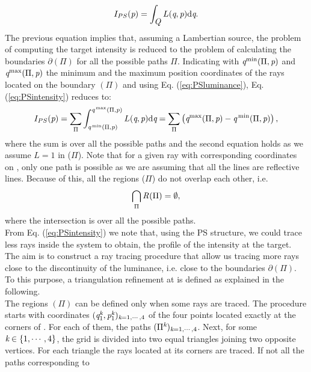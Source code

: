 \begin{equation}
\label{eq:PSintensity}
I_{PS}(\textit{p}) = \int_{\mbox{$\emph{Q}_{\textit{}}$}}L(\textit{q}, \textit{p}) \textrm{d}\textit{q}.
\end{equation}
The previous equation implies that, assuming a Lambertian source, the problem of computing the target intensity is reduced to the problem of calculating the boundaries
$\partial$$(\Pi)$ for all the possible paths $\Pi$. Indicating with $\textit{q}^\textrm{min}(\Pi,\textit{p})$ and $\textit{q}^\textrm{max}(\Pi,\textit{p})$ the minimum and the maximum position coordinates of the rays located on the boundary $(\Pi)$ and using Eq. (\ref{eq:PSluminance}), Eq. (\ref{eq:PSintensity}) reduces to:
\begin{equation}\label{eta2}
I_{PS}(\textit{p}) = \sum_{\Pi}\int_{\textit{q}^\textrm{\,min}(\Pi, \textit{p})}^{\textit{q}^\textrm{\,max}(\Pi,\textit{p})}L(\textit{q}, \textit{p})\textrm{d}\textit{q} = \sum_{\Pi}\big (\textit{q}^\textrm{max}(\Pi,\textit{p})-\textit{q}^\textrm{\,min}(\Pi,\textit{p})\big )\,,
\end{equation}
where the sum is over all the possible paths and the second equation holds as we assume $L=1$ in ($\Pi$).
Note that for a given ray with corresponding coordinates
on , only one path is possible as we are assuming that all the lines are reflective lines.
Because of this, all the regions ($\Pi$) do not overlap each other, i.e.
\begin{equation}
\bigcap_{\Pi}\mbox{$\emph{R}_{\textit{}}$}(\Pi)= \emptyset,
\end{equation}
where the intersection is over all the possible paths. \\ \indent
From Eq. (\ref{eq:PSintensity}) we note that, using the PS structure, we could trace less rays inside the system to obtain, the profile of the intensity at the target.
The aim is to construct a ray tracing procedure that allow us tracing more rays close to the discontinuity of the luminance, i.e. close to the boundaries $\partial$$(\Pi)$.
To this purpose, a triangulation refinement at  is defined as explained in the following. \\ \indent
The regions $(\Pi)$ can be defined only when some rays are traced.
The procedure starts with coordinates $(\textit{q}_1^{\textit{k}},\textit{p}_1^{\textit{k}})_{\textit{k}=1, \cdots, 4}$ of the four points located exactly at the corners of . For each of them, the paths $(\Pi^{\textit{k}})_{\textit{k}=1, \cdots, 4}$. Next, for some $\textit{k} \in\{1, \cdots, 4\}$, the grid is divided into two equal triangles joining two opposite vertices. For each triangle the rays located at its corners are traced. If not all the paths corresponding to

